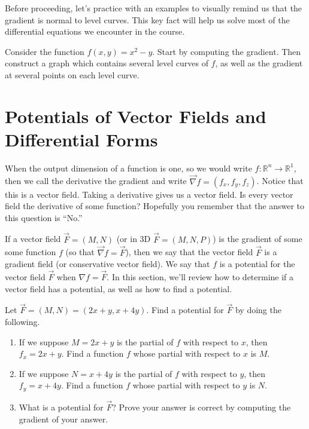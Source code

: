 {\begin{problem}
\end{problem}

Before proceeding, let's practice with an examples to visually remind us that the gradient is normal to level curves.  This key fact will help us solve most of the differential equations we encounter in the course.


\begin{problem}
Consider the function $f(x,y) = x^2-y$.    Start by computing the gradient. Then construct a graph which contains several level curves of $f$, as well as the gradient at several points on each level curve.
\end{problem}

\section{Potentials of Vector Fields and Differential Forms}
When the output dimension of a function is one, so we would write {$f:{\mathbb{R}}^n\to {\mathbb{R}}^1$}, then we call the derivative the gradient and write {$\vec \nabla f = (f_x,f_y,f_z)$}. 
Notice that this is a vector field.  Taking a derivative gives us a vector field. Is every vector field the derivative of some function?  Hopefully you remember that the answer to this question is ``No.''

If a vector field $\vec F = (M,N)$ (or in 3D $\vec F = (M,N,P)$) is the gradient of some some function $f$ (so that {$\vec \nabla f= \vec F$}), then we say that the vector field {$\vec F$} is a gradient field (or conservative vector field). We say that $f$ is a potential for the vector field $\vec F$ when $\nabla f=\vec F$. In this section, we'll review how to determine if a vector field has a potential, as well as how to find a potential.  

\begin{problem}
Let $\vec F = (M,N)=(2x+y, x+4y)$. Find a potential for $\vec F$ by doing the following.
\begin{enumerate}
 \item If we suppose $M=2x+y$ is the partial of $f$ with respect to $x$, then $f_x = 2x+y$.  Find a function $f$ whose partial with respect to $x$ is $M$. 
 \item If we suppose $N=x+4y$ is the partial of $f$ with respect to $y$, then $f_y = x+4y$.  Find a function $f$ whose partial with respect to $y$ is $N$.
 \item What is a potential for $\vec F$? Prove your answer is correct by computing the gradient of your answer. 
\end{enumerate}
\end{problem}

}
